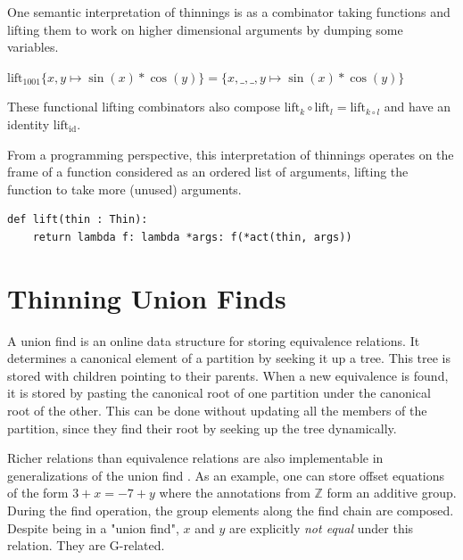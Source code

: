 \documentclass{article}%
\newcommand{\bR}{\mathbb{R}}
\newcommand{\lift}{\text{lift}}
\begin{document}
One semantic interpretation of thinnings is as a combinator taking functions and lifting them to work on higher dimensional arguments by dumping some variables.

$ \lift_{1001} \{x,y \mapsto \sin(x) * \cos(y) \} = \{x,\_,\_,y \mapsto \sin(x) * \cos(y) \} $

These functional lifting combinators also compose $\text{lift}_k \circ \text{lift}_l = \lift_{k \circ l}$ and have an identity $\lift_{\text{id}}$.

From a programming perspective, this interpretation of thinnings operates on the frame of a function considered as an ordered list of arguments, lifting the function to take more (unused) arguments.

\begin{lstlisting}
def lift(thin : Thin):
    return lambda f: lambda *args: f(*act(thin, args))
\end{lstlisting}


\section{Thinning Union Finds}
A union find is an online data structure for storing equivalence relations. It determines a canonical element of a partition by seeking it up a tree. This tree is stored with children pointing to their parents. When a new equivalence is found, it is stored by pasting the canonical root of one partition under the canonical root of the other. This can be done without updating all the members of the partition, since they find their root by seeking up the tree dynamically.

Richer relations than equivalence relations are also implementable in generalizations of the union find \cite{groupuf}. As an example, one can store offset equations of the form $3 + x = -7 + y$ where the annotations from $\mathbb{Z}$ form an additive group. During the find operation, the group elements along the find chain are composed. Despite being in a "union find", $x$ and $y$ are explicitly \textit{not equal} under this relation. They are G-related.

\end{document}
